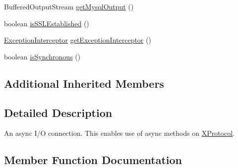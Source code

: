 \begin{DoxyCompactItemize}
\item 
Buffered\+Output\+Stream \mbox{\hyperlink{classcom_1_1mysql_1_1cj_1_1protocol_1_1x_1_1_x_async_socket_connection_a233c917f720ee49857c160155fbd75dc}{get\+Mysql\+Output}} ()
\item 
boolean \mbox{\hyperlink{classcom_1_1mysql_1_1cj_1_1protocol_1_1x_1_1_x_async_socket_connection_a312eb39f55bfb31c60beab6bb645f8c8}{is\+S\+S\+L\+Established}} ()
\item 
\mbox{\hyperlink{interfacecom_1_1mysql_1_1cj_1_1exceptions_1_1_exception_interceptor}{Exception\+Interceptor}} \mbox{\hyperlink{classcom_1_1mysql_1_1cj_1_1protocol_1_1x_1_1_x_async_socket_connection_a6cb71da85c0faf8459c9cc9ef3845759}{get\+Exception\+Interceptor}} ()
\item 
boolean \mbox{\hyperlink{classcom_1_1mysql_1_1cj_1_1protocol_1_1x_1_1_x_async_socket_connection_a0e10073e77bdd319bbf9346280c1dad7}{is\+Synchronous}} ()
\end{DoxyCompactItemize}
\subsection*{Additional Inherited Members}


\subsection{Detailed Description}
An async I/O connection. This enables use of async methods on \mbox{\hyperlink{classcom_1_1mysql_1_1cj_1_1protocol_1_1x_1_1_x_protocol}{X\+Protocol}}. 

\subsection{Member Function Documentation}
\mbox{\label{classcom_1_1mysql_1_1cj_1_1protocol_1_1x_1_1_x_async_socket_connection_a6b2b3e14475625ac633ea3258d4eeb08}} 
